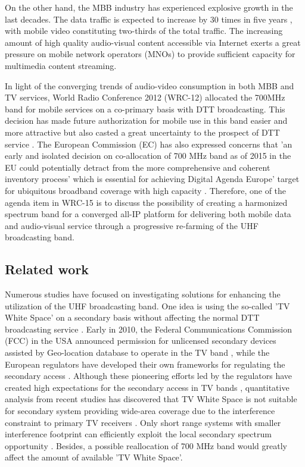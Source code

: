 \documentclass[journal]{IEEEtran}
\begin{document}
On the other hand, the MBB industry has experienced explosive growth in the last decades. The data traffic is expected to increase by 30 times in five years \cite{Cisco13}, with mobile video constituting two-thirds of the total traffic. The increasing amount of high quality audio-visual content accessible via Internet exerts a great pressure on mobile network operators (MNOs) to provide sufficient capacity for multimedia content streaming.

In light of the converging trends of audio-video consumption in both MBB and TV services, World Radio Conference 2012 (WRC-12) allocated the 700MHz band for mobile services on a co-primary basis with DTT broadcasting. This decision has made future authorization for mobile use in this band easier and more attractive but also casted a great uncertainty to the prospect of DTT service \cite{OFCOM13}. The European Commission (EC) has also expressed concerns that 'an early and isolated decision on co-allocation of 700 MHz band as of 2015 in the EU could potentially detract from the more comprehensive and coherent inventory process' which is essential for achieving Digital Agenda Europe' target for ubiquitous broadband coverage with high capacity \cite{RSPG}. Therefore, one of the agenda item in WRC-15 is to discuss the possibility of creating a harmonized spectrum band for a converged all-IP platform for delivering both mobile data and audio-visual service through a progressive re-farming of the UHF broadcasting band.


\subsection{Related work}
Numerous studies have focused on investigating solutions for enhancing the utilization of the UHF broadcasting band.
One idea is using the so-called 'TV White Space' on a secondary basis without affecting the normal DTT broadcasting service \cite{maz}. Early in 2010, the Federal Communications Commission (FCC) in the USA announced permission for unlicensed secondary devices assisted by Geo-location database to operate in the TV band \cite{fcc}, while the European regulators have developed their own frameworks for regulating the secondary access \cite{ofcom}\cite{ecc}. Although these pioneering efforts led by the regulators have created high expectations for the secondary access in TV bands \cite{sahai}, quantitative analysis from recent studies has discovered that TV White Space is not suitable for secondary system providing wide-area coverage due to the interference constraint to primary TV receivers \cite{EAB_DYSPAN12} \cite{Lei_DYSPAN12}\cite{jens13}. Only short range systems with smaller interference footprint can efficiently exploit the local secondary spectrum opportunity \cite{Lei_DYSPAN12}. Besides, a possible reallocation of 700 MHz band would greatly affect the amount of available 'TV White Space'.
\end{document}
